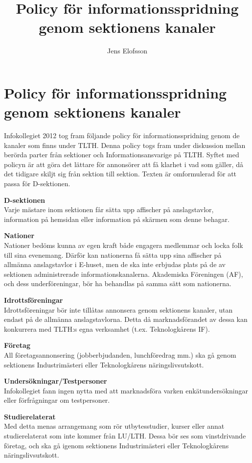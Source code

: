 \documentclass{dsekkallelse}
\title{Policy för informationsspridning genom sektionens kanaler}
\author{Jens Elofsson}
\begin{document}
\section{Policy för informationsspridning genom sektionens kanaler}

Infokollegiet 2012 tog fram följande policy för informationsspridning genom de kanaler som
finns under TLTH. Denna policy togs fram under diskussion mellan berörda parter från sektioner och Informationsansvarige på TLTH. Syftet med policyn är att göra det lättare för annonsörer att få klarhet i vad som gäller, då det tidigare skiljt sig från sektion till sektion. Texten är
omformulerad för att passa för D-sektionen.

 \textbf{D-sektionen}\\
Varje mästare inom sektionen får sätta upp affischer på anslagstavlor, information på
hemsidan eller information på skärmen som denne behagar.


\textbf{Nationer}\\
 Nationer bedöms kunna av egen kraft både engagera medlemmar och locka folk till sina
evenemang. Därför kan nationerna få sätta upp sina affischer på allmänna anslagstavlor i
E-huset, men de ska inte erbjudas plats på de av sektionen administrerade informationskanalerna. Akademiska Föreningen (AF), och dess underföreningar, bör ha behandlas på
samma sätt som nationerna.

\textbf{Idrottsföreningar}\\
Idrottsföreningar bör inte tillåtas annonsera genom sektionens kanaler, utan endast på
de allmänna anslagstavlorna. Detta då marknadsförandet av dessa kan konkurrera med
TLTH:s egna verksamhet (t.ex. Teknologkårens IF).

\textbf{Företag}\\
All företagsannonsering (jobberbjudanden, lunchföredrag mm.) ska gå genom sektionens
Industrimästeri eller Teknologkårens näringslivsutskott.

\textbf{Undersökningar/Testpersoner}\\
Infokollegiet fann ingen nytta med att marknadsföra varken enkätundersökningar eller
förfrågningar om testpersoner.

\textbf{Studierelaterat}\\
Med detta menas arrangemang som rör utbytesstudier, kurser eller annat studierelaterat
som inte kommer från LU/LTH. Dessa bör ses som vinstdrivande företag, och ska gå
igenom sektionens Industrimästeri eller Teknologkårens näringslivsutskott.
\end{document}
